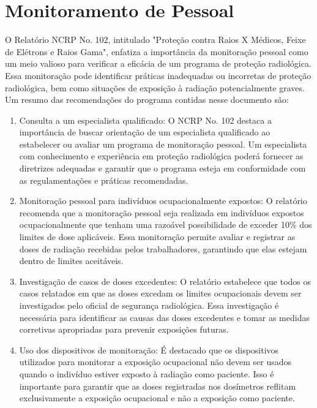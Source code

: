 \documentclass[11pt,a4paper]{article}
\begin{document}
\section{Monitoramento de Pessoal}

	O Relatório NCRP No. 102, intitulado "Proteção contra Raios X Médicos, Feixe de Elétrons e Raios Gama", enfatiza a importância da monitoração pessoal como um meio valioso para verificar a eficácia de um programa de proteção radiológica. Essa monitoração pode identificar práticas inadequadas ou incorretas de proteção radiológica, bem como situações de exposição à radiação potencialmente graves. Um resumo das recomendações do programa contidas nesse documento são:

	\begin{enumerate}
		\item Consulta a um especialista qualificado: O NCRP No. 102 destaca a importância de buscar orientação de um especialista qualificado ao estabelecer ou avaliar um programa de monitoração pessoal. Um especialista com conhecimento e experiência em proteção radiológica poderá fornecer as diretrizes adequadas e garantir que o programa esteja em conformidade com as regulamentações e práticas recomendadas.

		\item Monitoração pessoal para indivíduos ocupacionalmente expostos: O relatório recomenda que a monitoração pessoal seja realizada em indivíduos expostos ocupacionalmente que tenham uma razoável possibilidade de exceder 10\% dos limites de dose aplicáveis. Essa monitoração permite avaliar e registrar as doses de radiação recebidas pelos trabalhadores, garantindo que elas estejam dentro de limites aceitáveis.
		
		\item Investigação de casos de doses excedentes: O relatório estabelece que todos os casos relatados em que as doses excedam os limites ocupacionais devem ser investigados pelo oficial de segurança radiológica. Essa investigação é necessária para identificar as causas das doses excedentes e tomar as medidas corretivas apropriadas para prevenir exposições futuras.
		
		\item Uso dos dispositivos de monitoração: É destacado que os dispositivos utilizados para monitorar a exposição ocupacional não devem ser usados quando o indivíduo estiver exposto à radiação como paciente. Isso é importante para garantir que as doses registradas nos dosímetros reflitam exclusivamente a exposição ocupacional e não a exposição como paciente.
		

\end{enumerate}
\end{document}
